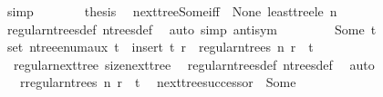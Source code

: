 \begin{isabellebody}
\ simp\isanewline
\ \ \ \ \isamarkupfalse%
\ \isamarkupfalse%
\ {\isacharquery}{\kern0pt}thesis\ \isamarkupfalse%
\ next{\isacharunderscore}{\kern0pt}tree{\isacharunderscore}{\kern0pt}Some{\isacharunderscore}{\kern0pt}iff\ {}\ None\ least{\isacharunderscore}{\kern0pt}tree{\isacharunderscore}{\kern0pt}le\ {\isacartoucheopen}n{\isasymnoteq}{}{\isacartoucheclose}\isanewline
\ \ \ \ \ \ \isamarkupfalse%
\ regular{\isacharunderscore}{\kern0pt}n{\isacharunderscore}{\kern0pt}trees{\isacharunderscore}{\kern0pt}def\ n{\isacharunderscore}{\kern0pt}trees{\isacharunderscore}{\kern0pt}def\ \isamarkupfalse%
\ {\isacharparenleft}{\kern0pt}auto\ simp{\isacharcolon}{\kern0pt}\ antisym{\isacharparenright}{\kern0pt}\isanewline
\ \ \isamarkupfalse%
\isanewline
\ \ \ \ \isamarkupfalse%
\ {\isacharparenleft}{\kern0pt}Some\ t{\isacharprime}{\kern0pt}{\isacharparenright}{\kern0pt}\isanewline
\ \ \ \ \isamarkupfalse%
\ \isamarkupfalse%
\ {\isachardoublequoteopen}set\ {\isacharparenleft}{\kern0pt}n{\isacharunderscore}{\kern0pt}tree{\isacharunderscore}{\kern0pt}enum{\isacharunderscore}{\kern0pt}aux\ t{\isacharparenright}{\kern0pt}\ {\isacharequal}{\kern0pt}\ insert\ t\ {\isacharbraceleft}{\kern0pt}r\ {\isasymin}\ regular{\isacharunderscore}{\kern0pt}n{\isacharunderscore}{\kern0pt}trees\ n{\isachardot}{\kern0pt}\ r\ {\isasymle}\ t{\isacharprime}{\kern0pt}{\isacharbraceright}{\kern0pt}{\isachardoublequoteclose}\isanewline
\ \ \ \ \ \ \isamarkupfalse%
\ {}\ regular{\isacharunderscore}{\kern0pt}next{\isacharunderscore}{\kern0pt}tree{\isacharprime}{\kern0pt}\ size{\isacharunderscore}{\kern0pt}next{\isacharunderscore}{\kern0pt}tree{\isacharprime}{\kern0pt}\ \isamarkupfalse%
\ regular{\isacharunderscore}{\kern0pt}n{\isacharunderscore}{\kern0pt}trees{\isacharunderscore}{\kern0pt}def\ n{\isacharunderscore}{\kern0pt}trees{\isacharunderscore}{\kern0pt}def\ \isamarkupfalse%
\ auto\isanewline
\ \ \ \ \isamarkupfalse%
\ \isamarkupfalse%
\ {\isachardoublequoteopen}{\isasymdots}\ {\isacharequal}{\kern0pt}\ {\isacharbraceleft}{\kern0pt}r{\isasymin}regular{\isacharunderscore}{\kern0pt}n{\isacharunderscore}{\kern0pt}trees\ n{\isachardot}{\kern0pt}\ r\ {\isasymle}\ t{\isacharbraceright}{\kern0pt}{\isachardoublequoteclose}\ \isamarkupfalse%
\ next{\isacharunderscore}{\kern0pt}tree{\isacharunderscore}{\kern0pt}successor\ {}{\isacharparenleft}{\kern0pt}{}{\isacharparenright}{\kern0pt}\ Some\ \isamarkupfalse%

\end{isabellebody}
